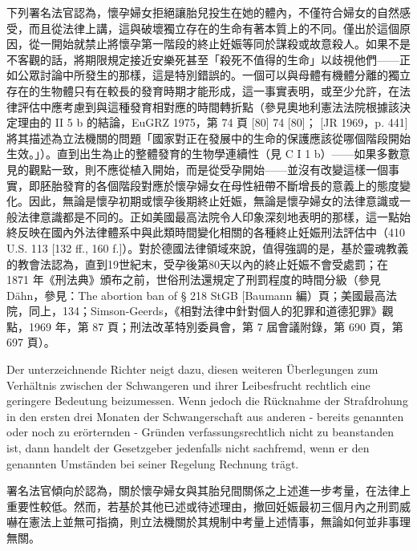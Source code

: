 \documentclass[12pt]{article}
\begin{document}
\begin{transpara}
下列署名法官認為，懷孕婦女拒絕讓胎兒投生在她的體內，不僅符合婦女的自然感受，而且從法律上講，這與破壞獨立存在的生命有著本質上的不同。僅出於這個原因，從一開始就禁止將懷孕第一階段的終止妊娠等同於謀殺或故意殺人。如果不是不客觀的話，將期限規定接近安樂死甚至「殺死不值得的生命」以歧視他們——正如公眾討論中所發生的那樣，這是特別錯誤的。一個可以與母體有機體分離的獨立存在的生物體只有在較長的發育時期才能形成，這一事實表明，或至少允許，在法律評估中應考慮到與這種發育相對應的時間轉折點（參見奧地利憲法法院根據該決定理由的 II 5 b 的結論，EuGRZ 1975，第 74 頁 [80] 74 [80]； [JR 1969，p. 441]將其描述為立法機關的問題「國家對正在發展中的生命的保護應該從哪個階段開始生效。」）。直到出生為止的整體發育的生物學連續性（見 C I 1 b）——如果多數意見的觀點一致，則不應從植入開始，而是從受孕開始——並沒有改變這樣一個事實，即胚胎發育的各個階段對應於懷孕婦女在母性紐帶不斷增長的意義上的態度變化。因此，無論是懷孕初期或懷孕後期終止妊娠，無論是懷孕婦女的法律意識或一般法律意識都是不同的。正如美國最高法院令人印象深刻地表明的那樣，這一點始終反映在國內外法律體系中與此類時間變化相關的各種終止妊娠刑法評估中（410 U.S. 113 [132 ff., 160 f.]）。對於德國法律領域來說，值得強調的是，基於靈魂教義的教會法認為，直到19世紀末，受孕後第80天以內的終止妊娠不會受處罰；在 1871 年《刑法典》頒布之前，世俗刑法還規定了刑罰程度的時間分級（參見 Dähn，參見：The abortion ban of § 218 StGB [Baumann 編）頁；美國最高法院，同上，134；Simson-Geerds，《相對法律中針對個人的犯罪和道德犯罪》觀點，1969 年，第 87 頁；刑法改革特別委員會，第 7 屆會議附錄，第 690 頁，第 697 頁）。
\end{transpara}

\syncleft
\begin{sourcepara}
Der unterzeichnende Richter neigt dazu, diesen weiteren Überlegungen zum Verhältnis zwischen der Schwangeren und ihrer Leibesfrucht rechtlich eine geringere Bedeutung beizumessen. Wenn jedoch die Rücknahme der Strafdrohung in den ersten drei Monaten der Schwangerschaft aus anderen - bereits genannten oder noch zu erörternden - Gründen verfassungsrechtlich nicht zu beanstanden ist, dann handelt der Gesetzgeber jedenfalls nicht sachfremd, wenn er den genannten Umständen bei seiner Regelung Rechnung trägt.
\end{sourcepara}
\begin{transpara}
署名法官傾向於認為，關於懷孕婦女與其胎兒間關係之上述進一步考量，在法律上重要性較低。然而，若基於其他已述或待述理由，撤回妊娠最初三個月內之刑罰威嚇在憲法上並無可指摘，則立法機關於其規制中考量上述情事，無論如何並非事理無關。
\end{transpara}
\end{document}
